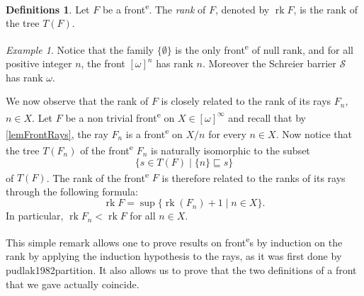 \documentclass{article}%
\newcommand\textcite{}
\theoremstyle{plain}
\theoremstyle{definition}
\newtheorem{definition}[theorem]{Definition}
\newtheorem{definition}[theorem]{Notation}
\newtheorem{definition}[theorem]{Notations}
\newtheorem{definition}[theorem]{Definitions}
\theoremstyle{remark}
\newtheorem{example}[theorem]{Example}
\newcommand{\ts}[1]{\textsuperscript{#1}}
\newcommand{\front}{front\ts{e}}
\DeclareMathOperator{\rk}{rk}
\newcommand{\segm} {\sqsubseteq}
\newcommand{\Schreier}{\mathcal{S}}
\newcommand{\infSub}[1]{[#1]^{\infty}}
\begin{document}
\begin{definition}
Let $F$ be a \front{}. 
The \emph{rank} of $F$, denoted by $\rk F$, is the rank of the tree $T(F)$.
\end{definition}

\begin{example}
Notice that the family $\{\emptyset\}$ is the only \front{} of null rank, and for all positive integer $n$, the front $[\omega]^{n}$ has rank $n$. Moreover the Schreier barrier $\Schreier$ has rank $\omega$.
\end{example}

We now observe that the rank of $F$ is closely related to the rank of its rays $F_{n}$, $n\in X$. Let $F$ be a non trivial \front{} on $X\in \infSub{\omega}$ and recall that by \cref{lemFrontRays}, the ray $F_{n}$ is a \front{} on $X/n$ for every $n\in X$. Now notice that the tree $T(F_{n})$ of the \front{} $F_{n}$ is naturally isomorphic to the subset 
\[
\{s\in T(F)\mid \{n\}\segm s\} 
\] 
of $T(F)$. The rank of the \front{} $F$ is therefore related to the ranks of its rays through the following formula:
\[
\rk F=\sup \{\rk (F_{n})+1 \mid n\in X\}.
\]
In particular, $\rk F_{n}<\rk F$ for all $n\in X$.

This simple remark allows one to prove results on \front{}s by induction on the rank by applying the induction hypothesis to the rays, as it was first done by \textcite{pudlak1982partition}. It also allows us to prove that the two definitions of a front that we gave actually coincide.
\end{document}
